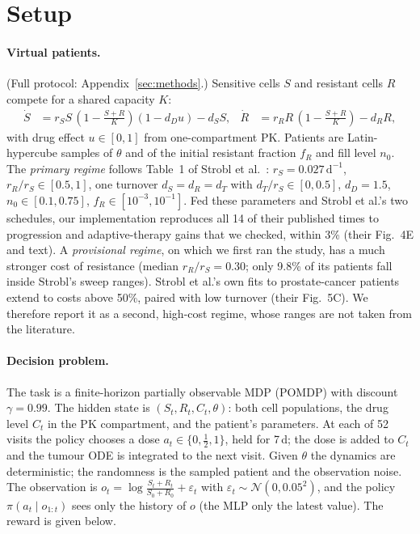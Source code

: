 \documentclass[10pt]{article}
\begin{document}
\section{Setup}\label{sec:setup}
\paragraph{Virtual patients.} (Full protocol: Appendix~\ref{sec:methods}.) Sensitive cells $S$ and resistant cells $R$
compete for a shared capacity $K$:
\begin{align*}
\dot S &= r_S S\,(1 - \tfrac{S+R}{K})(1 - d_D u) - d_S S, &
\dot R &= r_R R\,(1 - \tfrac{S+R}{K}) - d_R R,
\end{align*}
with drug effect $u\in[0,1]$ from one-compartment PK. Patients are
Latin-hypercube samples of $\theta$ and of the initial resistant fraction $f_R$
and fill level $n_0$. The \emph{primary regime} follows Table~1 of Strobl et
al.\ \citeyearpar{strobl2021}: $r_S = 0.027\,\mathrm{d}^{-1}$, $r_R/r_S \in [0.5, 1]$,
one turnover $d_S=d_R=d_T$ with $d_T/r_S\in[0,0.5]$, $d_D=1.5$,
$n_0\in[0.1,0.75]$, $f_R\in[10^{-3},10^{-1}]$. Fed these parameters and
Strobl et al.'s two schedules, our implementation reproduces all 14 of their
published times to progression and adaptive-therapy gains that we checked,
within 3\% (their Fig.~4E and text). %
A \emph{provisional regime}, on
which we first ran the study, has a much stronger cost of resistance (median
$r_R/r_S = 0.30$; only 9.8\% of its patients fall inside Strobl's sweep
ranges). Strobl et al.'s own fits to prostate-cancer patients extend to costs
above 50\%, paired with low turnover (their Fig.~5C). We therefore report it as
a second, high-cost regime, whose ranges are not taken from the literature.
\paragraph{Decision problem.} The task is a finite-horizon partially observable MDP (POMDP) with discount $\gamma=0.99$. The hidden state is $(S_t,R_t,C_t,\theta)$: both cell populations, the drug level $C_t$ in the PK compartment, and the patient's parameters. At each of 52 visits the policy chooses a dose $a_t\in\{0,\tfrac12,1\}$, held for 7\,d; the dose is added to $C_t$ and the tumour ODE is integrated to the next visit. Given $\theta$ the dynamics are deterministic; the randomness is the sampled patient and the observation noise. The observation is $o_t=\log\frac{S_t+R_t}{S_0+R_0}+\varepsilon_t$ with $\varepsilon_t\sim\mathcal{N}(0,0.05^2)$, and the policy $\pi(a_t\mid o_{1:t})$ sees only the history of $o$ (the MLP only the latest value). The reward is given below.
\end{document}
